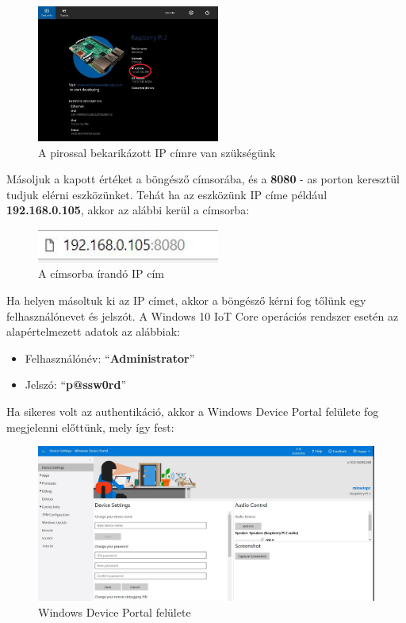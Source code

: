 \documentclass[a4paper,12pt]{report}
\begin{document}
\begin{figure}[h!]
    \hspace{5cm}
    \includegraphics[width=6cm]{images/rpiip.jpg}
    \caption{A pirossal bekarikázott IP címre van szükségünk}
    \label{fig: Raspberry IP}
\end{figure}

    Másoljuk a kapott értéket a böngésző címsorába, és a \textbf{8080} - as porton keresztül tudjuk elérni eszközünket.
    Tehát ha az eszközünk IP címe például \textbf{192.168.0.105}, akkor az alábbi kerül a címsorba:

\begin{figure}[h!]
    \hspace{5cm}
    \includegraphics[width=6cm]{images/browserrpi.jpg}
    \caption{A címsorba írandó IP cím}
    \label{fig: Raspberry IP Browser}
\end{figure}

    Ha helyen másoltuk ki az IP címet, akkor a böngésző kérni fog tőlünk egy felhasználónevet és jelszót. A Windows 10 IoT Core
    operációs rendszer esetén az alapértelmezett adatok az alábbiak:

\begin{itemize}
    \item Felhasználónév: ``\textbf{Administrator}''
    \item Jelszó: ``\textbf{p@ssw0rd}''
\end{itemize}

    Ha sikeres volt az authentikáció, akkor a Windows Device Portal felülete fog megjelenni előttünk, mely így fest:

\begin{figure}[h!]
    \includegraphics[width=\linewidth]{images/deviceportal.jpg}
    \caption{Windows Device Portal felülete}
    \label{fig: Windows Device Portal}
\end{figure}
\end{document}
